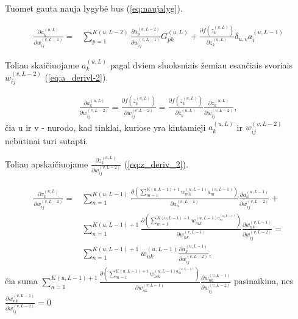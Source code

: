 Tuomet gauta nauja lygybė bus (\ref{eq:naujalyg}).

\begin{equation}\label{eq:naujalyg}
  \begin{aligned}
    \frac{\partial a_k^{(u, L)}}{\partial w_{ij}^{(v,L-1)}} = &
      \sum_{p=1}^{K(u,L-2)}
      \frac{\partial a_p^{(u,L-2)}}{\partial w_{ij}^{(v,L-1)}}G_{pk}^{(u,L)} + \frac{\partial f(z_k^{(u, L)})}{\partial z_k^{(u,L)}} \delta_{u,v}a_i^{(u,L-1)}
\end{aligned}
\end{equation}


Toliau skaičiuojame $a_k^{(u, L)}$ pagal dviem sluoksniais žemiau esančiais svoriais $w_{ij}^{(v,L-2)}$ (\ref{eq:a_derivl-2}).

\begin{equation} \label{eq:a_derivl-2}
  \begin{aligned}
  \frac{\partial a_k^{(u, L)}}{\partial w_{ij}^{(v,L-2)}} =
  \frac{\partial f(z_k^{(u, L)})}{\partial w_{ij}^{(v,L-2)}} =
  \frac{\partial f(z_k^{(u, L)})}{\partial z_k^{(u,L)}} \frac{\partial z_k^{(u,L)}}{\partial w_{ij}^{(v,L-2)}},
  \end{aligned}
\end{equation}
čia u ir v - nurodo, kad tinklai, kuriose yra kintamieji $a_k^{(u, L)}$ ir $w_{ij}^{(v,L-2)}$ nebūtinai turi sutapti.

Toliau apskaičiuojame $\frac{\partial z_k^{(u,L)}}{\partial w_{ij}^{(v,L-2)}}$ (\ref{eq:z_deriv_2}).

\begin{equation} \label{eq:z_deriv_2}
  \begin{aligned}
    \frac{\partial z_k^{(u,L)}}{\partial w_{ij}^{(v,L-2)}} =&
      \sum_{n=1}^{K(u, L-1)} \frac{\partial (\sum_{m=1}^{K(u,L-1)+1} w_{mk}^{(u,L-1)} a_m^{(u,L-1)} )}{\partial a_n^{(u,L-1)}}
      \frac{\partial a_n^{(u,L-1)}}{\partial w_{ij}^{(v,L-2)}} + \\
      &\sum_{n=1}^{K(u, L-1)+1} \frac{\partial (\sum_{m=1}^{K(u,L-1)+1}  w_{mk}^{(u,L-1) a_m^{(u,L-1)}} )}{\partial w_{nk}^{(v,L-1)}}
      \frac{\partial w_{nk}^{(v,L-1)}}{\partial w_{ij}^{(v,L-2)}} =\\
    &\sum_{n=1}^{K(u, L-1)+1} w_{nk}^{(u,L-1)} \frac{\partial a_k^{(u, L-1)}}{\partial w_{ij}^{(v,L-2)}},
  \end{aligned}
\end{equation}
čia suma $\sum_{n=1}^{K(u, L-1)+1} \frac{\partial (\sum_{m=1}^{K(u,L-1)+1} w_{mk}^{(u,L-1) a_m^{(u,L-1)}} )}{\partial w_{nk}^{(v,L-1)}} \frac{\partial w_{nk}^{(v,L-1)}}{\partial w_{ij}^{(v,L-2)}}$ pasinaikina, nes $\frac{\partial w_{nk}^{(v,L-1)}}{\partial w_{ij}^{(v,L-2)}}=0$

